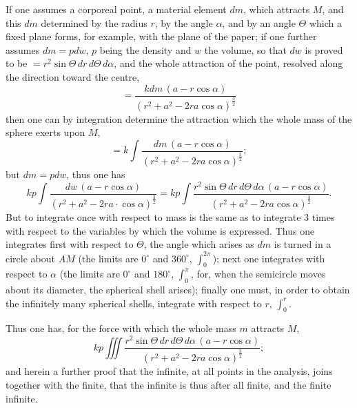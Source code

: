 \documentclass[12pt]{book}
\begin{document}
If one assumes a corporeal point, a material element $dm$, which
attracts $M$, and this $dm$ determined by the radius $r$, by the angle
$\alpha$, and by an angle $\Theta$ which a fixed plane forms, for example,
with the plane of the paper; if one further assumes $dm = pdw$, $p$ being
the density and $w$ the volume, so that $dw$ is proved to be
$= r^{2}\sin\Theta\,dr\,d\Theta\,d\alpha$, and the whole
attraction of the point, resolved along the direction toward the centre,
\[
= \frac{kdm\,(a - r\cos\alpha)}{(r^{2} + a^{2} - 2ra\cos\alpha)^{\frac{3}{2}}}
\]
then one can by integration determine the attraction which the whole
mass of the sphere exerts upon $M$,
\[
= k\int \frac{dm\,(a - r\cos\alpha)}
  {(r^{2} + a^{2} - 2ra\cos\alpha)^{\frac{3}{2}}};
\]
but $dm = pdw$, thus one has
\[
kp\int \frac{dw\,(a - r\cos\alpha)}
  {(r^{2} + a^{2} - 2ra\cdot\cos\alpha)^{\frac{3}{2}}}
= kp\int \frac{r^{2}\sin\Theta\,dr\,d\Theta\,d\alpha\,(a - r\cos\alpha)}
  {(r^{2} + a^{2} - 2ra\cos\alpha)^{\frac{3}{2}}}.
\]
But to integrate once with respect to mass is the same as to
integrate 3 times with respect to the variables by which the volume is
expressed. Thus one integrates first with respect to $\Theta$, the angle
which arises as
$dm$ is turned in a circle about $AM$ (the limits are $0^{\circ}$ and
$360^{\circ}$, $\int_{0}^{2\pi}$); next one integrates with respect to
$\alpha$ (the limits are $0^{\circ}$ and $180^{\circ}$,
$\int_{0}^{\pi}$, for, when the semicircle moves about its diameter,
the spherical shell arises); finally one must, in order to obtain the infinitely
many spherical shells, integrate with respect to $r$, $\int_{0}^{r}$.

Thus one has, for the force with which the whole mass $m$ attracts $M$,
\[
kp\iiint \frac{r^{2}\sin\Theta\,dr\,d\Theta\,d\alpha\,(a - r\cos\alpha)}
  {(r^{2} + a^{2} - 2ra\cos\alpha)^{\frac{3}{2}}};
\]
and herein a further proof that the infinite, at all points in the
analysis, joins together with the finite, that the infinite is thus
after all finite, and the finite infinite.
\end{document}
